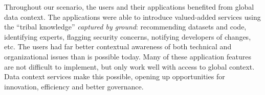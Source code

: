 \documentclass{sig-alternate}
\begin{document}
Throughout our scenario, the users and their applications benefited from global data context. 
The applications were able to introduce valued-added services using the ``tribal knowledge'' \emph{captured by ground}:
recommending datasets and code, identifying experts, flagging security concerns, notifying developers of changes, etc.
The users had far better contextual awareness of both technical and organizational issues than is possible today.
Many of these application features are not difficult to implement, but only work well with access to global context. 
Data context services make this possible, opening up opportunities for innovation, efficiency and better governance.




    
    
    









\end{document}
